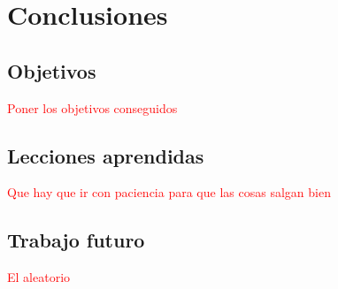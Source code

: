 \chapter{Conclusiones}
\section{Objetivos}
\textcolor{red}{Poner los objetivos conseguidos}

\section{Lecciones aprendidas}
\textcolor{red}{Que hay que ir con paciencia para que las cosas salgan bien}

\section{Trabajo futuro}
\textcolor{red}{El aleatorio}